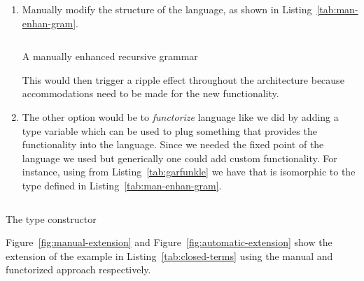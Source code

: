 \documentclass[thesis-solanki.tex]{subfiles}
\begin{document}
\begin{enumerate}
\item Manually modify the structure of the language, as shown in Listing~\ref{tab:man-enhan-gram}.
  \begin{code-list}[H]
\begin{singlespace}
\inputminted{haskell}{haskell-proto1-man-enhan-gram.hs}
\end{singlespace}
    \caption{A manually enhanced recursive grammar}
    \label{tab:man-enhan-gram}
  \end{code-list}

  This would then trigger a ripple effect throughout the architecture because accommodations need to be made for
  the new functionality.

\item
  The other option would be to \textit{functorize} language like we did by adding a type variable which can be used
  to plug something that provides the functionality into the language.
  Since we needed the fixed point of the language we used  but generically one could add
  custom functionality.
  For instance, using  from Listing~\ref{tab:garfunkle} we have that
    is isomorphic to the type defined in
  Listing~\ref{tab:man-enhan-gram}.

\end{enumerate}



\begin{code-list}[H]
\begin{singlespace}
\inputminted{haskell}{haskell-proto1-garfunkle.hs}
\end{singlespace}
  \caption{The  type constructor}
  \label{tab:garfunkle}
\end{code-list}

Figure~\ref{fig:manual-extension} and Figure~\ref{fig:automatic-extension} show the extension of the example in
Listing~\ref{tab:closed-terms} using the manual and functorized approach respectively.
\end{document}
